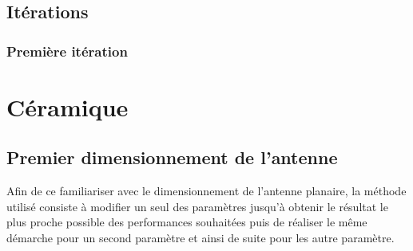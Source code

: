 \documentclass[Deriaz_Traiber_Labo02]{subfiles}
\begin{document}
\subsection{Itérations}
\subsubsection{Première itération}





\section{Céramique}




\subsection{Premier dimensionnement de l'antenne}

Afin de ce familiariser avec le dimensionnement de l'antenne planaire, la méthode utilisé consiste à modifier un seul des paramètres jusqu'à obtenir le résultat le plus proche possible des performances souhaitées puis de réaliser le même démarche pour un second paramètre et ainsi de suite pour les autre paramètre.
\end{document}
